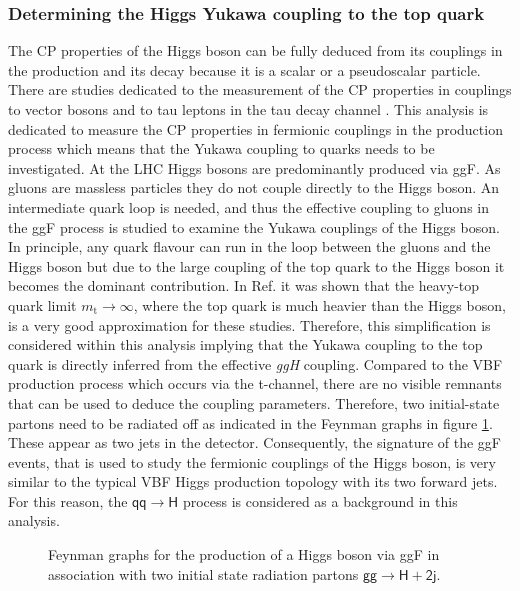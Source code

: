 \subsubsection{Determining the Higgs Yukawa coupling to the top quark}
The CP properties of the Higgs boson can be fully deduced from its couplings in the production and its decay because it is a scalar or a pseudoscalar particle. There are studies dedicated 
to the measurement of the CP properties in couplings to vector bosons \cite{CMS-AN-17-034} and to tau leptons in the tau
decay channel \cite{claudia_thesis}. This analysis is dedicated to measure the CP properties in fermionic couplings in the production process which means that 
the Yukawa coupling to quarks needs to be investigated. 
At the LHC Higgs bosons are predominantly produced via ggF. As gluons are massless particles they do not couple directly to the Higgs boson. An intermediate quark loop 
is needed, and thus the effective coupling to gluons in the ggF process is studied to examine the Yukawa couplings of the Higgs boson. 
In principle, any quark flavour can run in the loop between the gluons and the Higgs boson but due to the large coupling of the top quark to the Higgs boson it becomes the 
dominant contribution. In Ref. \cite{DelDuca:2001eu} it was shown that the heavy-top quark limit $m_\text{t}\rightarrow \infty$, where the top quark is much heavier than the Higgs boson, 
is a very good approximation for these studies. Therefore, this simplification is considered within this analysis implying that the Yukawa coupling to the 
top quark is directly inferred from the effective \textit{ggH} coupling.
Compared to the VBF production process which occurs via the t-channel, there are no visible remnants that can be used to deduce the coupling parameters. 
Therefore, two initial-state partons need to be radiated off as indicated in the Feynman graphs in figure \ref{theory:ggH2j_feynman}. These
appear as two jets in the detector. Consequently, the signature of the ggF events, that is used to study the fermionic couplings of the Higgs boson, is very similar to the typical VBF Higgs production topology with its two forward jets. 
For this reason, the $\mathsf{qq\rightarrow{H}}$ process is considered as a background in this analysis.

\begin{figure}[h]
    \centering
    
    
    
    \caption[ggF plus two jets diagrams.]{Feynman graphs for the production of a Higgs boson via ggF in association with two initial state radiation partons $\mathsf{gg\rightarrow H+2j}$.}\label{theory:ggH2j_feynman}
\end{figure}

